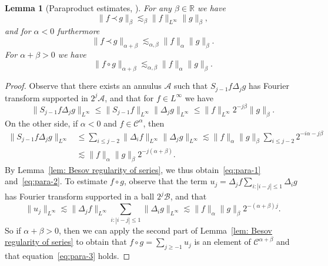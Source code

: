 \documentclass[a4paper,11pt]{article}
\newtheorem{lemma}[theorem]{Lemma}
\theoremstyle{remark}
\newcommand{\CA}{\ensuremath{\mathscr{A}}}
\newcommand{\CB}{\ensuremath{\mathscr{B}}}
\newcommand{\CC}{\ensuremath{\mathscr{C}}}
\newcommand{\lpara}{\,\mathord{\prec}\,}
\newcommand{\reso}{\,\mathord{\circ}\,}
\begin{document}
\begin{lemma}[Paraproduct estimates, \cite{Bony1981}]\label{thm:paraproduct}
   For any $\beta \in \mathbb{R}$ we have
   \begin{equation} \label{eq:para-1}
       \| f \lpara g \|_{\beta} \lesssim_{\beta} \| f \|_{L^{\infty}} \| g \|_{\beta} ,
   \end{equation}
   and for $\alpha <0$ furthermore
   \begin{equation}\label{eq:para-2}
      \| f \lpara g \|_{\alpha + \beta} \lesssim_{\alpha , \beta} \| f \|_{\alpha} \| g \|_{\beta}.
   \end{equation}
   For $\alpha + \beta >0$ we have
   \begin{equation}\label{eq:para-3}
      \| f \reso g \|_{\alpha + \beta} \lesssim_{\alpha , \beta} \| f \|_{\alpha} \| g \|_{\beta}.
    \end{equation}
\end{lemma}

\begin{proof}
  Observe that there exists an annulus $\CA$ such that $S_{j-1} f \Delta_{j} g$ has Fourier transform supported in $2^{j} \CA$, and that for $f \in L^{\infty}$ we have
  \[
     \| S_{j-1} f \Delta_{j} g \|_{L^{\infty}} \leqslant \| S_{j-1} f  \|_{L^{\infty}} \| \Delta_{j} g \|_{L^{\infty}} \leqslant \| f \|_{L^{\infty}} 2^{-j \beta} \| g \|_{\beta}.
  \]
  On the other side, if $\alpha <0$ and $f \in \CC^{\alpha}$, then
  \begin{align*}
     \| S_{j-1} f \Delta_{j} g \|_{L^{\infty}} & \leqslant \sum_{i \leqslant j-2} \| \Delta_{i} f \|_{L^{\infty}} \| \Delta_{j} g \|_{L^{\infty}} \lesssim \| f \|_{\alpha} \| g \|_{\beta} \sum_{i \leqslant j-2} 2^{-i\alpha -j \beta} \\
     & \lesssim \| f \|_{\alpha} \| g \|_{\beta} 2^{-j ( \alpha + \beta )} .
  \end{align*}
  By Lemma~\ref{lem: Besov regularity of series}, we thus obtain~{\eqref{eq:para-1}} and~{\eqref{eq:para-2}}. To estimate $f \reso g$, observe that the term $u_{j} = \Delta_{j} f \sum_{i: | i-j | \leqslant 1} \Delta_{i} g$ has Fourier transform supported in a ball $2^{j} \CB$, and that
  \[
     \| u_{j} \|_{L^{\infty}} \lesssim \| \Delta_{j} f \|_{L^{\infty}} \sum_{i: | i-j | \leqslant 1} \| \Delta_{i} g \|_{L^{\infty}} \lesssim \| f \|_{\alpha} \| g \|_{\beta} 2^{- ( \alpha + \beta ) j}.
  \]
  So if $\alpha + \beta >0$, then we can apply the second part of Lemma~\ref{lem: Besov regularity of series} to obtain that $f \reso g= \sum_{j \geqslant -1} u_{j}$ is an element of $\CC^{\alpha + \beta}$ and that equation~{\eqref{eq:para-3}} holds.
\end{proof}
\end{document}
